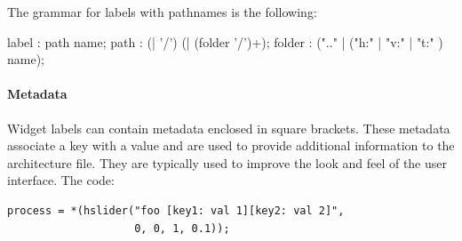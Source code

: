 The grammar for labels with pathnames is the following:

\begin{rail}
 label : path name;
 path : (| '/') (| (folder '/')+);
 folder : (".." | ("h:" | "v:" | "t:" ) name);
\end{rail}

\paragraph{Metadata}
Widget labels can contain metadata enclosed in square brackets. These metadata associate a key with a value and are used to provide additional information to the architecture file.  They are typically used to improve the look and feel of the user interface. 
The \faust code:
\begin{lstlisting}
process = *(hslider("foo [key1: val 1][key2: val 2]", 
					0, 0, 1, 0.1));
\end{lstlisting}

